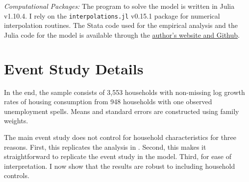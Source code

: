 \documentclass[12pt]{article}
\begin{document}
\textit{Computational Packages:}
The program to solve the model is written in Julia v1.10.4. I rely on the \texttt{interpolations.jl} v0.15.1 package for numerical interpolation routines. The Stata code used for the empirical analysis and the Julia code for the model is available through the \href{https://github.com/eirikbrandsaas/HomeownershipBankMomDad.jl}{author's website and Github}.

\section{Event Study Details}\label{app:eventstudy_details}
In the end, the sample consists of 3,553 households with non-missing log growth rates of housing consumption from 948 households with one observed unemployment spells. Means and standard errors are constructed using family weights. 

The main event study does not control for household characteristics for three reasons. First, this replicates the analysis in \cite{Chetty2007}. Second, this makes it straightforward to replicate the event study in the model. Third, for ease of interpretation. I now show that the results are robust to including household controls.
\end{document}
